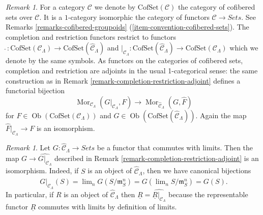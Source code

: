 \documentclass{stacks-project}
\theoremstyle{plain}
\theoremstyle{definition}
\theoremstyle{remark}
\newtheorem{remark}[subsection]{Remark}
\numberwithin{equation}{subsection}
\def\lim{\mathop{\mathrm{lim}}\nolimits}
\def\Mor{\mathop{\mathrm{Mor}}\nolimits}
\def\Ob{\mathop{\mathrm{Ob}}\nolimits}
\begin{document}
\begin{remark}
\label{remark-completion-restriction-cofset-adjoint}
For a category $\mathcal{C}$ we denote by $\text{CofSet}(\mathcal{C})$ the
category of cofibered sets over $\mathcal{C}$. It is a $1$-category
isomorphic the category of functors $\mathcal{C} \to \textit{Sets}$.
See Remarks \ref{remarks-cofibered-groupoids}
(\ref{item-convention-cofibered-sets}).
The completion and restriction functors restrict to functors
$\widehat{~} : \text{CofSet}(\mathcal{C}_\Lambda) \to
\text{CofSet}(\widehat{\mathcal{C}}_\Lambda)$ and
$|_{\mathcal{C}_\Lambda} : \text{CofSet}(\widehat{\mathcal{C}}_\Lambda) \to
\text{CofSet}(\mathcal{C}_\Lambda)$ which we denote by the same symbols.
As functors on the categories of cofibered sets, completion and restriction
are adjoints in the usual 1-categorical sense: the same construction as in
Remark \ref{remark-completion-restriction-adjoint} defines a functorial
bijection
$$
\Mor_{\mathcal{C}_\Lambda}(G|_{\mathcal{C}_\Lambda}, F)
\longrightarrow
\Mor_{\widehat{\mathcal{C}}_\Lambda}(G, \widehat{F})
$$
for $F \in \Ob(\text{CofSet}(\mathcal{C}_\Lambda))$ and
$G \in \Ob(\text{CofSet}(\widehat{\mathcal{C}}_\Lambda))$.
Again the map $\widehat{F}|_{\mathcal{C}_\Lambda} \to F$ is an
isomorphism.
\end{remark}

\begin{remark}
\label{remark-restrict-complete-continuous-functor}
Let $G : \widehat{\mathcal{C}}_\Lambda \to \textit{Sets}$
be a functor that commutes with limits.
Then the map $G \to \widehat{G|_{\mathcal{C}_\Lambda}}$ described in
Remark \ref{remark-completion-restriction-adjoint}
is an isomorphism. Indeed, if $S$ is  an object of
$\widehat{\mathcal{C}}_\Lambda$, then we have canonical bijections
$$
\widehat{G|_{\mathcal{C}_\Lambda}}(S) =
\lim_n G(S/\mathfrak{m}_S^n) =
G(\lim_n S/\mathfrak{m}_S^n) = G(S).
$$
In particular, if $R$ is an object of $\widehat{\mathcal{C}}_\Lambda$ then
$\underline{R} = \widehat{\underline{R}|_{\mathcal{C}_\Lambda}}$ because
the representable functor $\underline{R}$ commutes with limits by definition
of limits.
\end{remark}
\end{document}
